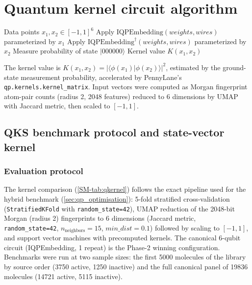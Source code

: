 \documentclass[11pt,a4paper]{article}
\begin{document}
\section{Quantum kernel circuit algorithm}
\label{sec:qkernel_algorithm}

\begin{algorithm}[htbp]
\caption{Quantum kernel circuit for 6-qubit state overlap using PennyLane's \texttt{IQPEmbedding} template.}
\label{SM-alg:qkernel}
\begin{algorithmic}[1]
\REQUIRE Data points $x_1, x_2 \in [-1, 1]^6$
\STATE Apply $\mathrm{IQPEmbedding}(weights, wires)$ parameterized by $x_1$
\STATE Apply $\mathrm{IQPEmbedding}^\dagger(weights, wires)$ parameterized by $x_2$
\STATE Measure probability of state $|000000\rangle$
\RETURN Kernel value $K(x_1, x_2)$
\end{algorithmic}
\end{algorithm}

The kernel value is $K(x_1, x_2) = |\langle \phi(x_1) | \phi(x_2) \rangle|^2$, estimated by the ground-state measurement probability, accelerated by PennyLane's \texttt{qp.kernels.kernel\_matrix}. Input vectors were computed as Morgan fingerprint atom-pair counts (radius 2, \num{2048} features) reduced to 6 dimensions by UMAP with Jaccard metric, then scaled to $[-1, 1]$.

\subsection{QKS benchmark protocol and state-vector kernel}
\label{sec:qks_benchmark}

\subsubsection{Evaluation protocol}
The kernel comparison (\cref{SM-tab:qkernel}) follows the exact pipeline used for the hybrid benchmark (\cref{sec:qp_optimisation}): 5-fold stratified cross-validation (\texttt{StratifiedKFold} with \texttt{random\_state=42}), UMAP reduction of the 2048-bit Morgan (radius 2) fingerprints to 6 dimensions (Jaccard metric, \texttt{random\_state=42}, $n_{\text{neighbors}}=15$, $min\_dist=0.1$) followed by scaling to $[-1,1]$, and support vector machines with precomputed kernels. The canonical 6-qubit circuit (IQPEmbedding, 1 repeat) is the Phase-2 winning configuration. Benchmarks were run at two sample sizes: the first \num{5000} molecules of the library by source order (\num{3750} active, \num{1250} inactive) and the full canonical panel of \num{19836} molecules (\num{14721} active, \num{5115} inactive).
\end{document}
